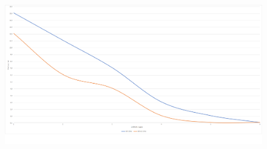 \begin{figure}[H]                                                                                                                                                            
\centering                                                                                                                                                                   
\includegraphics[width=\textwidth]{images/result4}                                                                                                                                   
\label{fig:result4}                                                                                                                                                           
\end{figure}



